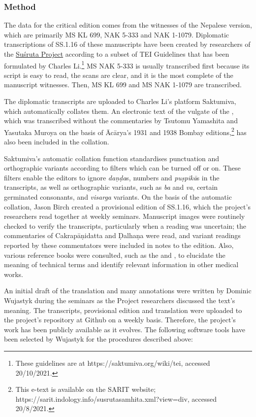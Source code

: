 \subsubsection{Method}
The data for the critical edition comes from the witnesses of the Nepalese version, which are primarily MS KL 699, NAK 5-333 and NAK 1-1079. Diplomatic transcriptions of SS.1.16 of these manuscripts have been created by researchers of the \href{https://sushrutaproject.org}{Suśruta Project}\space%
according to a subset of TEI Guidelines that has been formulated by Charles Li.\footnote{These guidelines are at https://saktumiva.org/wiki/tei, accessed 20/10/2021.} MS NAK 5-333 is usually transcribed first because its script is easy to read, the scans are clear, and it is the most complete of the manuscript witnesses. Then, MS KL 699 and MS NAK 1-1079 are transcribed. 

The diplomatic transcripts are uploaded to Charles Li's platform Saktumiva, which automatically collates them. An electronic text of the vulgate of the \SS, which was transcribed without the commentaries by Tsutomu Yamashita and Yasutaka Muroya on the basis of Ācārya's 1931 and 1938 Bombay editions,\footnote{This e-text is available on the SARIT website; https://sarit.indology.info/susrutasamhita.xml?view=div, accessed 20/8/2021.} has also been included in the collation. 

Saktumiva's automatic collation function standardises punctuation and orthographic variants according to filters which can be turned off or on. These filters enable the editors to ignore \emph{daṇḍa}s, numbers and \emph{puṣpikā}s in the transcripts, as well as orthographic variants, such as \emph{ba} and \emph{va}, certain germinated consonants, and \emph{visarga} variants. On the basis of the automatic collation, Jason Birch created a provisional edition of SS.1.16, which the project's researchers read together at weekly seminars. Manuscript images were routinely checked to verify the transcripts, particularly when a reading was uncertain; the commentaries of Cakrapāṇidatta and Ḍalhaṇa were read, and variant readings reported by these commentators were included in notes to the edition. Also, various reference books were consulted, such as the  \citet{josi-maha,nadk-1954} and \citet{meul-hist}, to elucidate the meaning of technical terms and identify relevant information in other medical works. 

An initial draft of the translation and many annotations were written by Dominic Wujastyk during the seminars as the Project researchers discussed the text's meaning. The transcripts, provisional edition and translation were uploaded to the project's repository at Github on a weekly basis. Therefore, the project's work has been publicly available as it evolves. The following software tools have been selected by Wujastyk for the procedures described above: 


